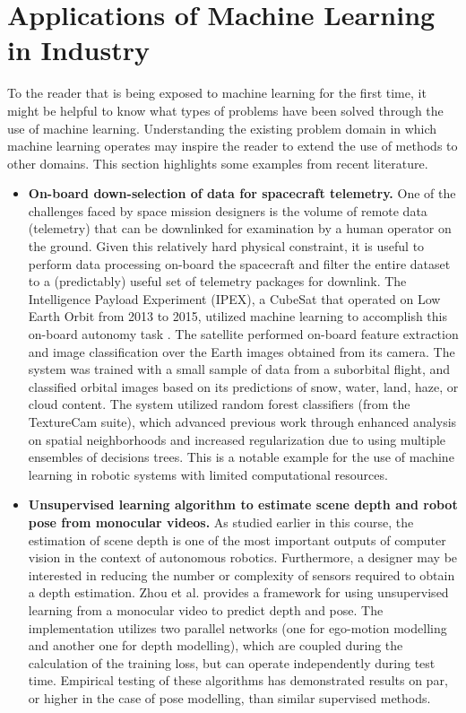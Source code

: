 \documentclass[twoside]{article}
\begin{document}
\section{Applications of Machine Learning in Industry}

To the reader that is being exposed to machine learning for the first time, it might be helpful to know what types of problems have been solved through the use of machine learning. Understanding the existing problem domain in which machine learning operates may inspire the reader to extend the use of methods to other domains. This section highlights some examples from recent literature.

\begin{itemize}
\item \textbf{On-board down-selection of data for spacecraft telemetry.}
One of the challenges faced by space mission designers is the volume of remote data (telemetry) that can be downlinked for examination by a human operator on the ground. Given this relatively hard physical constraint, it is useful to perform data processing on-board the spacecraft and filter the entire dataset to a (predictably) useful set of telemetry packages for downlink. The Intelligence Payload Experiment (IPEX), a CubeSat that operated on Low Earth Orbit from 2013 to 2015, utilized machine learning to accomplish this on-board autonomy task \cite{ipex}. The satellite performed on-board feature extraction and image classification over the Earth images obtained from its camera. The system was trained with a small sample of data from a suborbital flight, and classified orbital images based on its predictions of snow, water, land, haze, or cloud content. The system utilized random forest classifiers (from the TextureCam suite), which advanced previous work through enhanced analysis on spatial neighborhoods and increased regularization due to using multiple ensembles of decisions trees. This is a notable example for the use of machine learning in robotic systems with limited computational resources.

\item \textbf{Unsupervised learning algorithm to estimate scene depth and robot pose from monocular videos.} 
As studied earlier in this course, the estimation of scene depth is one of the most important outputs of computer vision in the context of autonomous robotics. Furthermore, a designer may be interested in reducing the number or complexity of sensors required to obtain a depth estimation. Zhou et al. \cite{zhou2017unsupervised} provides a framework for using unsupervised learning from a monocular video to predict depth and pose. The implementation utilizes two parallel networks (one for ego-motion modelling and another one for depth modelling), which are coupled during the calculation of the training loss, but can operate independently during test time. Empirical testing of these algorithms has demonstrated results on par, or higher in the case of pose modelling, than similar supervised methods. 


\end{itemize}
\end{document}
